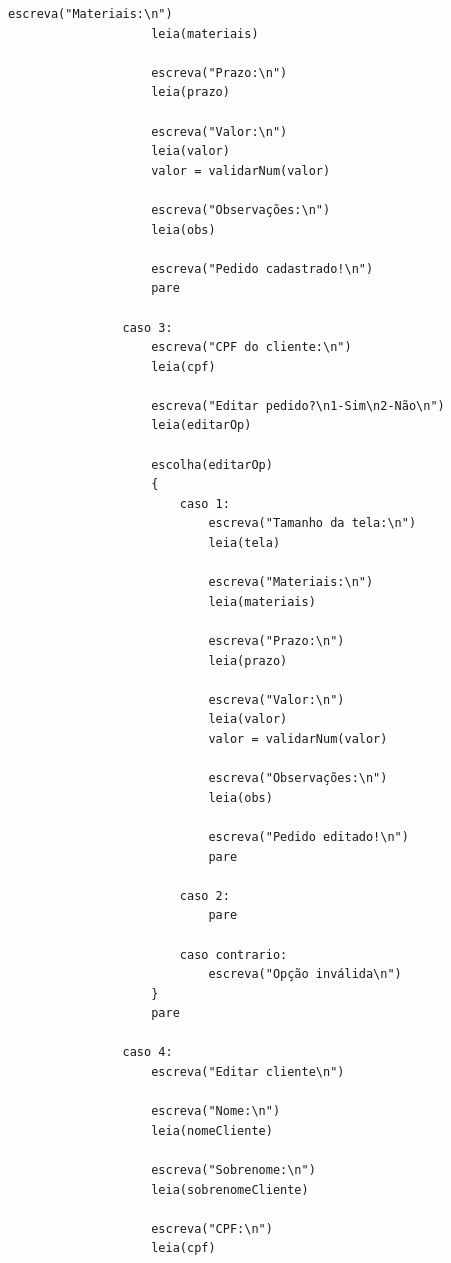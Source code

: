 \begin{lstlisting}[caption={Clasee programa em Portugol}, label={lst:programa_portugol}]
                    escreva("Materiais:\n")
                    leia(materiais)

                    escreva("Prazo:\n")
                    leia(prazo)

                    escreva("Valor:\n")
                    leia(valor)
                    valor = validarNum(valor)

                    escreva("Observações:\n")
                    leia(obs)

                    escreva("Pedido cadastrado!\n")
                    pare

                caso 3:
                    escreva("CPF do cliente:\n")
                    leia(cpf)

                    escreva("Editar pedido?\n1-Sim\n2-Não\n")
                    leia(editarOp)

                    escolha(editarOp)
                    {
                        caso 1:
                            escreva("Tamanho da tela:\n")
                            leia(tela)

                            escreva("Materiais:\n")
                            leia(materiais)

                            escreva("Prazo:\n")
                            leia(prazo)

                            escreva("Valor:\n")
                            leia(valor)
                            valor = validarNum(valor)

                            escreva("Observações:\n")
                            leia(obs)

                            escreva("Pedido editado!\n")
                            pare

                        caso 2:
                            pare

                        caso contrario:
                            escreva("Opção inválida\n")
                    }
                    pare

                caso 4:
                    escreva("Editar cliente\n")

                    escreva("Nome:\n")
                    leia(nomeCliente)

                    escreva("Sobrenome:\n")
                    leia(sobrenomeCliente)

                    escreva("CPF:\n")
                    leia(cpf)


\end{lstlisting}

